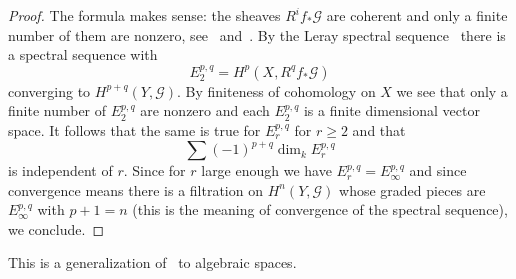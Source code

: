 \begin{proof}
The formula makes sense: the sheaves $R^if_*\mathcal{G}$ are coherent
and only a finite number of them are nonzero, see~
and~.
By the Leray spectral sequence~ there is a spectral sequence with
$$
E_2^{p, q} = H^p(X, R^qf_*\mathcal{G})
$$
converging to $H^{p + q}(Y, \mathcal{G})$.
By finiteness of cohomology on $X$ we see that only a finite number of
$E_2^{p, q}$ are nonzero and each $E_2^{p, q}$ is a finite dimensional vector
space.
It follows that the same is true for $E_r^{p, q}$ for $r \geq 2$ and that
$$
\sum (-1)^{p + q} \dim_k E_r^{p, q}
$$
is independent of $r$.
Since for $r$ large enough we have $E_r^{p, q} = E_\infty^{p, q}$ and since
convergence means there is a filtration on $H^n(Y, \mathcal{G})$ whose graded
pieces are $E_\infty^{p, q}$ with $p + 1 = n$ (this is the meaning of
convergence of the spectral sequence), we conclude.
\end{proof}

This is a generalization of~ to algebraic spaces.

